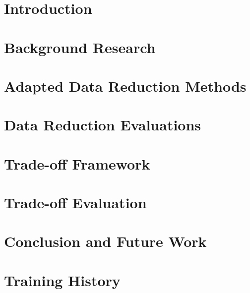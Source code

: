 \documentclass[msc,deptreport,dsti]{infthesis} %
\begin{document}
\chapter{Introduction}


\chapter{Background Research}
\label{bg}


\chapter{Adapted Data Reduction Methods}


\chapter{Data Reduction Evaluations}


\chapter{Trade-off Framework}


\chapter{Trade-off Evaluation}


\chapter{Conclusion and Future Work}








 \appendix
 
 \chapter{Training History}
 

% 
\end{document}
